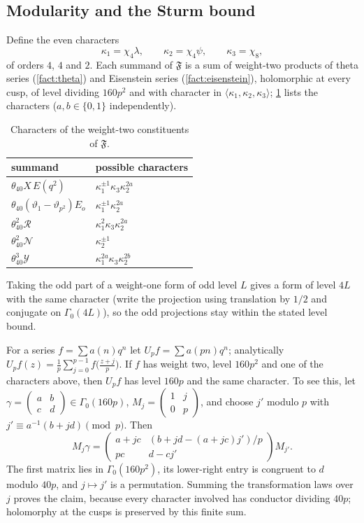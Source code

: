 \subsection{Modularity and the Sturm bound}
Define the even characters
\[
  \kappa_1=\chi_4\lambda,\qquad \kappa_2=\chi_4\psi,\qquad \kappa_3=\chi_8,
\]
of orders $4$, $4$ and $2$. Each summand of $\mathfrak F$ is a sum of weight-two
products of theta series (\cref{fact:theta}) and Eisenstein series
(\cref{fact:eisenstein}), holomorphic at every cusp, of level dividing $160p^2$ and
with character in $\langle\kappa_1,\kappa_2,\kappa_3\rangle$; \cref{tab:characters}
lists the characters ($a,b\in\{0,1\}$ independently).

\begin{table}[ht]
\caption{Characters of the weight-two constituents of $\mathfrak F$.}\label{tab:characters}
\begin{tabular}{ll}
\toprule
summand & possible characters\\
\midrule
$\theta_{40}X\,E(q^2)$ & $\kappa_1^{\pm1}\kappa_3\kappa_2^{2a}$\\
$\theta_{40}(\vartheta_1-\vartheta_{p^2})E_o$ & $\kappa_1^{\pm1}\kappa_2^{2a}$\\
$\theta_{40}^2\mathcal R$ & $\kappa_1^2\kappa_3\kappa_2^{2a}$\\
$\theta_{40}^2\mathcal N$ & $\kappa_2^{\pm1}$\\
$\theta_{40}^3\mathcal Y$ & $\kappa_1^{2a}\kappa_3\kappa_2^{2b}$\\
\bottomrule
\end{tabular}
\end{table}

Taking the odd part of a weight-one form of odd level $L$ gives a form of level
$4L$ with the same character (write the projection using translation by $1/2$
and conjugate on $\Gamma_0(4L)$), so the odd projections stay within the stated
level bound.

For a series $f=\sum a(n)q^n$ let $U_pf=\sum a(pn)q^n$; analytically
$U_pf(z)=\frac1p\sum_{j=0}^{p-1}f\bigl(\frac{z+j}p\bigr)$. If $f$ has weight two, level
$160p^2$ and one of the characters above, then $U_pf$ has level $160p$ and the same
character. To see this, let $\gamma=\begin{pmatrix}a&b\\c&d\end{pmatrix}\in\Gamma_0(160p)$,
$M_j=\begin{pmatrix}1&j\\0&p\end{pmatrix}$, and choose $j'$ modulo $p$ with
$j'\equiv a^{-1}(b+jd)\pmod p$. Then
\[
  M_j\gamma=\begin{pmatrix}a+jc&(b+jd-(a+jc)j')/p\\ pc&d-cj'\end{pmatrix}M_{j'} .
\]
The first matrix lies in $\Gamma_0(160p^2)$, its lower-right entry is congruent to
$d$ modulo $40p$, and $j\mapsto j'$ is a permutation. Summing the transformation
laws over $j$ proves the claim, because every character involved has conductor
dividing $40p$; holomorphy at the cusps is preserved by this finite sum.

